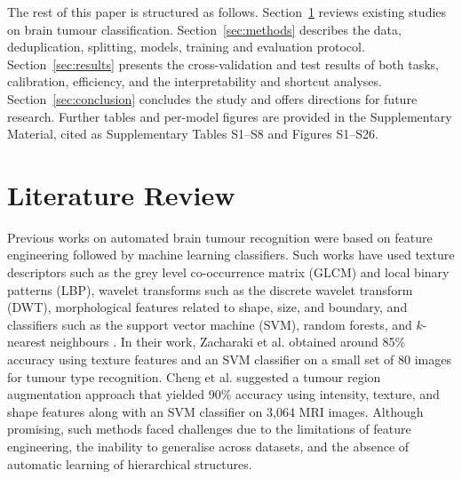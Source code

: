\documentclass[final,3p,times,number]{elsarticle}
\begin{document}
The rest of this paper is structured as follows. Section~\ref{sec:lit} reviews existing studies on brain tumour classification. Section~\ref{sec:methods} describes the data, deduplication, splitting, models, training and evaluation protocol. Section~\ref{sec:results} presents the cross-validation and test results of both tasks, calibration, efficiency, and the interpretability and shortcut analyses. Section~\ref{sec:conclusion} concludes the study and offers directions for future research. Further tables and per-model figures are provided in the Supplementary Material, cited as Supplementary Tables S1--S8 and Figures S1--S26.

\section{Literature Review}
\label{sec:lit}

Previous works on automated brain tumour recognition were based on feature engineering followed by machine learning classifiers. Such works have used texture descriptors such as the grey level co-occurrence matrix (GLCM) and local binary patterns (LBP), wavelet transforms such as the discrete wavelet transform (DWT), morphological features related to shape, size, and boundary, and classifiers such as the support vector machine (SVM), random forests, and $k$-nearest neighbours \cite{ref2,ref3}. In their work, Zacharaki et al. \cite{ref1} obtained around 85\% accuracy using texture features and an SVM classifier on a small set of 80 images for tumour type recognition. Cheng et al. \cite{ref5} suggested a tumour region augmentation approach that yielded 90\% accuracy using intensity, texture, and shape features along with an SVM classifier on 3,064 MRI images. Although promising, such methods faced challenges due to the limitations of feature engineering, the inability to generalise across datasets, and the absence of automatic learning of hierarchical structures.
\end{document}
